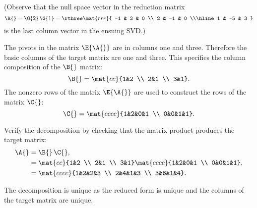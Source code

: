 (Observe that the null space vector in the reduction matrix
\begin{equation}
  \R{} =\G{2}\,\G{1} = 
  \rthree \mat{rrr}{
 -1 & 2 & 0 \\
 2 & -1 & 0 \\\hline
 1 & -5 & 3
  }
\end{equation}
is the last column vector in the ensuing SVD.)

The pivots in the matrix $\E{\A{}}$ are in columns one and three. Therefore the basic columns of the target matrix are one and three. This specifies the column composition of the $\B{}$ matrix:
\begin{equation}
  \B{} = \mat{cc}{1&2 \\ 2&1 \\ 3&1}.
\end{equation}
The nonzero rows of the matrix $\E{\A{}}$ are used to construct the rows of the matrix $\C{}$:
\begin{equation}
  \C{} = \mat{cccc}{1&2&0&1 \\ 0&0&1&1}.
\end{equation}
 
Verify the decomposition by checking that the matrix product produces the target matrix:
\begin{equation}
  \begin{split}
    \A{} &= \B{}\,\C{},\\
     &= \mat{cc}{1&2 \\ 2&1 \\ 3&1} \mat{cccc}{1&2&0&1 \\ 0&0&1&1},\\
     &= \mat{cccc}{1&2&2&3 \\ 2&4&1&3 \\ 3&6&1&4}.
  \end{split}
\end{equation}

The decomposition is unique as the reduced form is unique and the columns of the target matrix are unique.

